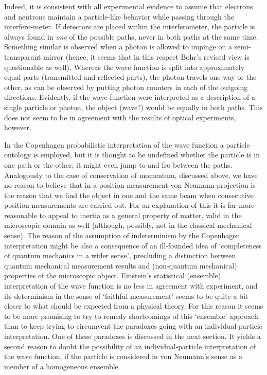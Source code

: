 \documentclass[12pt]{article}
\begin{document}
Indeed, it is consistent with all experimental evidence to assume
that electrons and neutrons maintain a particle-like behavior
while passing through the interfero-\linebreak meter. If detectors
are placed within the interferometer, the particle is always found
in {\em one} of the possible paths, never in both paths at the
same time. Something similar is observed when a photon is allowed
to impinge on a semi-transparant mirror (hence, it seems that in
this respect Bohr's revised view is questionable as well). Whereas
the wave function is split into approximately equal parts
(transmitted and reflected parts), the photon travels one way or
the other, as can be observed by putting photon counters in each
of the outgoing directions. Evidently, if the wave function were
interpreted as a description of a single particle or photon, the
object (wave?) would be equally in both paths. This does not seem
to be in agreement with the results of optical experiments,
however.

In the Copenhagen probabilistic interpretation of the wave
function a particle ontology is employed, but it is thought to be
undefined whether the particle is in one path or the other; it
might even jump to and fro between the paths. Analogously to the
case of conservation of momentum, discussed above, we have no
reason to believe that in a position measurement von Neumann
projection is the reason that we find the object in one and the
same beam when consecutive position measurements are carried out.
For an explanation of this it is far more reasonable to appeal to
inertia as a general property of matter, valid in the microscopic
domain as well (although, possibly, not in the classical
mechanical sense). The reason of the assumption of indeterminism
by the Copenhagen interpretation might be also a consequence of an
ill-founded idea of `completeness of quantum mechanics in a wider
sense', precluding a distinction between quantum mechanical
measurement results and (non-quantum mechanical) properties of the
microscopic object. Einstein's statistical (ensemble)
interpretation of the wave function is no less in agreement with
experiment, and its determinism in the sense of `faithful
measurement' seems to be quite a bit closer to what should be
expected from a physical theory. For this reason it seems to be
more promising to try to remedy shortcomings of this `ensemble'
approach than to keep trying to circumvent the paradoxes going
with an individual-particle interpretation. One of these paradoxes
is discussed in the next section. It yields a second reason to
doubt the possibility of an individual-particle interpretation of
the wave function, if the particle is considered in von Neumann's
sense as a member of a homogeneous ensemble.
\end{document}
